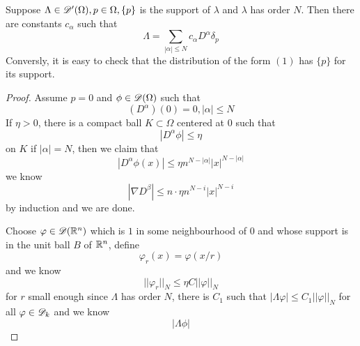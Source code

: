 \begin{theorem}
    Suppose $\Lambda \in \mathscr{D}'(\Omega), p\in \Omega, \{p\}$ is the support of $\lambda$ and $\lambda$ has order $N$. Then there are constants $c_{\alpha}$ such that
    \[
    \Lambda = \sum\limits_{|\alpha| \leq N} c_{\alpha}D^{\alpha}\delta_p
    \]
    Conversly, it is easy to check that the distribution of the form $(1)$ has $\{p\}$ for its support.
\end{theorem}
\begin{proof}
    Assume $p = 0$ and $\phi \in \mathscr{D}(\Omega)$ such that
    \[
    (D^{\alpha})(0) = 0, |\alpha| \leq N
    \]
    If $\eta > 0$, there is a compact ball $K\subset \Omega$ centered at $0$ such that
    \[|D^{\alpha} \phi| \leq \eta\]
    on $K$ if $|\alpha| = N$, then we claim that
    \[
    |D^{\alpha} \phi(x)| \leq \eta n^{N-|\alpha|}|x|^{N-|\alpha|}
    \]
    we know 
    \[|\nabla D^{\beta}| \leq n\cdot \eta n^{N-i}|x|^{N-i}\]
    by induction and we are done.\par
    Choose $\varphi \in \mathscr{D}(\mathbb{R}^n)$ which is $1$ in some neighbourhood of $0$ and whose support is in the unit ball $B$ of $\mathbb{R}^n$, define
    \[
    \varphi_r(x) = \varphi(x/r)
    \]
    and we know
    \[
    ||\varphi_r||_N \leq \eta C||\varphi||_N
    \]
    for $r$ small enough since $\Lambda$ has order $N$, there is $C_1$ such that $|\Lambda \varphi| \leq C_1||\varphi||_N$ for all $\varphi \in \mathscr{D}_k$ and we know
    \[
    |\Lambda \phi| 
    \]
\end{proof}

